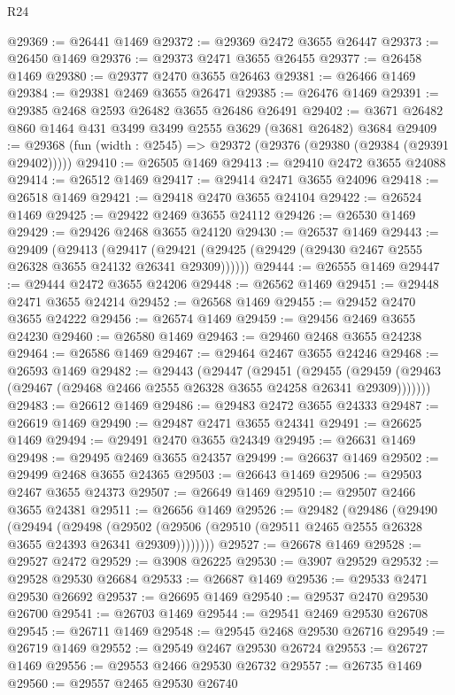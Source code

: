 \begin{lexlean}{R24}
\begin{coremodule}
@29369 := @26441 @1469
@29372 := @29369 @2472 @3655 @26447
@29373 := @26450 @1469
@29376 := @29373 @2471 @3655 @26455
@29377 := @26458 @1469
@29380 := @29377 @2470 @3655 @26463
@29381 := @26466 @1469
@29384 := @29381 @2469 @3655 @26471
@29385 := @26476 @1469
@29391 := @29385 @2468 @2593 @26482 @3655 @26486 @26491
@29402 := @3671 @26482 @860 @1464 @431 @3499 @3499 @2555 @3629 (@3681 @26482) @3684
@29409 := @29368 (fun (width : @2545) => @29372 (@29376 (@29380 (@29384 (@29391 @29402)))))
@29410 := @26505 @1469
@29413 := @29410 @2472 @3655 @24088
@29414 := @26512 @1469
@29417 := @29414 @2471 @3655 @24096
@29418 := @26518 @1469
@29421 := @29418 @2470 @3655 @24104
@29422 := @26524 @1469
@29425 := @29422 @2469 @3655 @24112
@29426 := @26530 @1469
@29429 := @29426 @2468 @3655 @24120
@29430 := @26537 @1469
@29443 := @29409
    (@29413
      (@29417 (@29421 (@29425 (@29429 (@29430 @2467 @2555 @26328 @3655 @24132 @26341 @29309))))))
@29444 := @26555 @1469
@29447 := @29444 @2472 @3655 @24206
@29448 := @26562 @1469
@29451 := @29448 @2471 @3655 @24214
@29452 := @26568 @1469
@29455 := @29452 @2470 @3655 @24222
@29456 := @26574 @1469
@29459 := @29456 @2469 @3655 @24230
@29460 := @26580 @1469
@29463 := @29460 @2468 @3655 @24238
@29464 := @26586 @1469
@29467 := @29464 @2467 @3655 @24246
@29468 := @26593 @1469
@29482 := @29443
    (@29447
      (@29451
        (@29455 (@29459 (@29463 (@29467 (@29468 @2466 @2555 @26328 @3655 @24258 @26341 @29309)))))))
@29483 := @26612 @1469
@29486 := @29483 @2472 @3655 @24333
@29487 := @26619 @1469
@29490 := @29487 @2471 @3655 @24341
@29491 := @26625 @1469
@29494 := @29491 @2470 @3655 @24349
@29495 := @26631 @1469
@29498 := @29495 @2469 @3655 @24357
@29499 := @26637 @1469
@29502 := @29499 @2468 @3655 @24365
@29503 := @26643 @1469
@29506 := @29503 @2467 @3655 @24373
@29507 := @26649 @1469
@29510 := @29507 @2466 @3655 @24381
@29511 := @26656 @1469
@29526 := @29482
    (@29486
      (@29490
        (@29494
          (@29498
            (@29502 (@29506 (@29510 (@29511 @2465 @2555 @26328 @3655 @24393 @26341 @29309))))))))
@29527 := @26678 @1469
@29528 := @29527 @2472
@29529 := @3908 @26225
@29530 := @3907 @29529
@29532 := @29528 @29530 @26684
@29533 := @26687 @1469
@29536 := @29533 @2471 @29530 @26692
@29537 := @26695 @1469
@29540 := @29537 @2470 @29530 @26700
@29541 := @26703 @1469
@29544 := @29541 @2469 @29530 @26708
@29545 := @26711 @1469
@29548 := @29545 @2468 @29530 @26716
@29549 := @26719 @1469
@29552 := @29549 @2467 @29530 @26724
@29553 := @26727 @1469
@29556 := @29553 @2466 @29530 @26732
@29557 := @26735 @1469
@29560 := @29557 @2465 @29530 @26740

\end{coremodule}
\end{lexlean}
